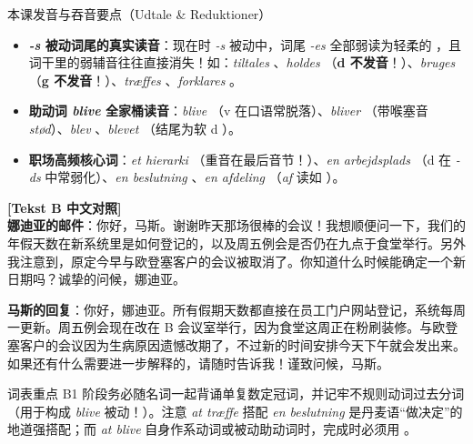 \begin{tipbox}{本课发音与吞音要点（Udtale \& Reduktioner）}
\begin{itemize}
  \item \textbf{\textit{-s} 被动词尾的真实读音}：现在时 \textit{-s} 被动中，词尾 \textit{-es} 全部弱读为轻柔的 ，且词干里的弱辅音往往直接消失！如：\textit{tiltales} 、\textit{holdes} （\textbf{d 不发音}！）、\textit{bruges} （\textbf{g 不发音}！）、\textit{træffes} 、\textit{forklares} 。
  \item \textbf{助动词 \textit{blive} 全家桶读音}：\textit{blive} （v 在口语常脱落）、\textit{bliver} （带喉塞音 \textit{stød}）、\textit{blev} 、\textit{blevet} （结尾为软 d ）。
  \item \textbf{职场高频核心词}：\textit{et hierarki} （重音在最后音节！）、\textit{en arbejdsplads} （d 在 \textit{-ds} 中常弱化）、\textit{en beslutning} 、\textit{en afdeling} （\textit{af} 读如 ）。
\end{itemize}
\end{tipbox}

\begin{transbox}
\small
\textbf{\color{NCDTeal}[Tekst B 中文对照]}\\
\textbf{娜迪亚的邮件}：你好，马斯。谢谢昨天那场很棒的会议！我想顺便问一下，我们的年假天数在新系统里是如何登记的，以及周五例会是否仍在九点于食堂举行。另外我注意到，原定今早与欧登塞客户的会议被取消了。你知道什么时候能确定一个新日期吗？诚挚的问候，娜迪亚。

\textbf{马斯的回复}：你好，娜迪亚。所有假期天数都直接在员工门户网站登记，系统每周一更新。周五例会现在改在 B 会议室举行，因为食堂这周正在粉刷装修。与欧登塞客户的会议因为生病原因遗憾改期了，不过新的时间安排今天下午就会发出来。如果还有什么需要进一步解释的，请随时告诉我！谨致问候，马斯。
\end{transbox}


\begin{tipbox}{词表重点}
B1 阶段务必随名词一起背诵单复数定冠词，并记牢不规则动词过去分词（用于构成 \textit{blive} 被动！）。注意 \textit{at træffe} 搭配 \textit{en beslutning} 是丹麦语“做决定”的地道强搭配；而 \textit{at blive} 自身作系动词或被动助动词时，完成时必须用 \dabold{[er]}。
\end{tipbox}

